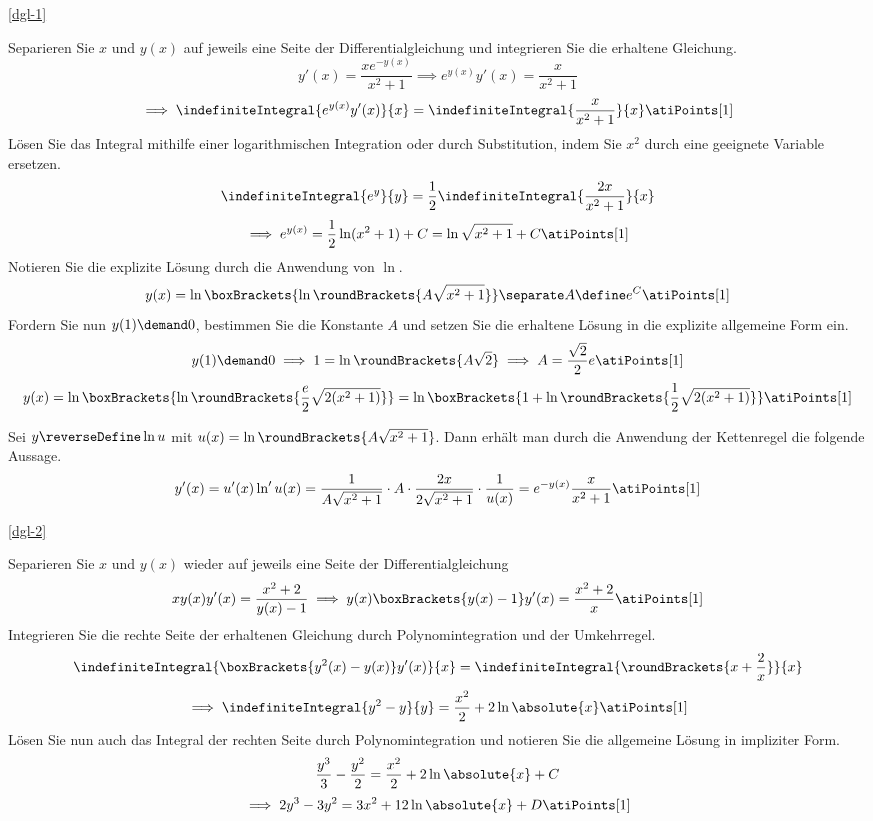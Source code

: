 \begin{atiSolution}
	\begin{atiSubtaskSolutions}
		\item[\ref{dgl-1}]{
			Separieren Sie $x$ und $y(x)$ auf jeweils eine Seite der Differentialgleichung und integrieren Sie die erhaltene Gleichung.
			\[
				y'(x) = \frac{xe^{-y(x)}}{x^2 + 1} \implies e^{y(x)} y'(x) = \frac{x}{x^2 + 1}
			\]
			\[
				\implies \indefiniteIntegral{e^{y(x)}y'(x)}{x} = \indefiniteIntegral{\frac{x}{x^2+1}}{x}
				\atiPoints[1]
			\]
			Lösen Sie das Integral mithilfe einer logarithmischen Integration oder durch Substitution, indem Sie $x^2$ durch eine geeignete Variable ersetzen.
			\[
				\indefiniteIntegral{e^y}{y} = \frac{1}{2} \indefiniteIntegral{\frac{2x}{x^2+1}}{x}
			\]
			\[
				\implies e^{y(x)} = \frac{1}{2}\ln(x^2 + 1) + C = \ln\sqrt{x^2 + 1} + C
				\atiPoints[1]
			\]
			Notieren Sie die explizite Lösung durch die Anwendung von $\ln$.
			\[
				y(x) = \ln\boxBrackets{\ln\roundBrackets{A\sqrt{x^2+1}}} \separate A\define e^C
				\atiPoints[1]
			\]
			Fordern Sie nun $y(1)\demand 0$, bestimmen Sie die Konstante $A$ und setzen Sie die erhaltene Lösung in die explizite allgemeine Form ein.
			\[
				y(1) \demand 0 \implies 1 = \ln \roundBrackets{A\sqrt{2}} \implies A = \frac{\sqrt{2}}{2}e
				\atiPoints[1]
			\]
			\[
				y(x) = \ln\boxBrackets{\ln\roundBrackets{\frac{e}{2}\sqrt{2(x^2 + 1)}}} = \ln\boxBrackets{1 + \ln\roundBrackets{\frac{1}{2}\sqrt{2(x^2+1)}}}
				\atiPoints[1]
			\]

			Sei $y\reverseDefine \ln u$ mit $u(x) = \ln\roundBrackets{A\sqrt{x^2+1}}$.
			Dann erhält man durch die Anwendung der Kettenregel die folgende Aussage.
			\[
				y'(x) = u'(x) \ln' u(x) = \frac{1}{A\sqrt{x^2+1}} \cdot A \cdot \frac{2x}{2\sqrt{x^2+1}} \cdot \frac{1}{u(x)} = e^{-y(x)} \frac{x}{x^2+1}
				\atiPoints[1]
			\]
		}

		\item[\ref{dgl-2}]{
			Separieren Sie $x$ und $y(x)$ wieder auf jeweils eine Seite der Differentialgleichung
			\[
				xy(x)y'(x) = \frac{x^2+2}{y(x)-1} \implies y(x)\boxBrackets{y(x)-1}y'(x) = \frac{x^2+2}{x}
				\atiPoints[1]
			\]
			Integrieren Sie die rechte Seite der erhaltenen Gleichung durch Polynomintegration und der Umkehrregel.
			\[
				\indefiniteIntegral{\boxBrackets{y^2(x)-y(x)}y'(x)}{x} = \indefiniteIntegral{\roundBrackets{x+\frac{2}{x}}}{x}
			\]
			\[
				\implies \indefiniteIntegral{y^2-y}{y} = \frac{x^2}{2} + 2\ln\absolute{x}
				\atiPoints[1]
			\]
			Lösen Sie nun auch das Integral der rechten Seite durch Polynomintegration und notieren Sie die allgemeine Lösung in impliziter Form.
			\[
				\frac{y^3}{3} - \frac{y^2}{2} = \frac{x^2}{2} + 2\ln\absolute{x} + C
			\]
			\[
				\implies 2y^3 - 3y^2 = 3x^2 + 12 \ln \absolute{x} + D
				\atiPoints[1]
			\]

}
\end{atiSubtaskSolutions}
\end{atiSolution}
